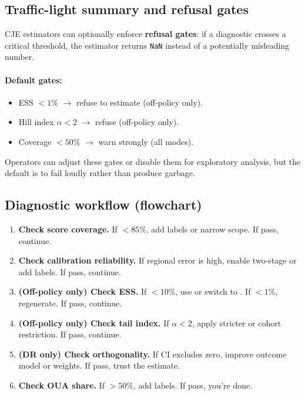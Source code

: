 \subsection{Traffic-light summary and refusal gates}

CJE estimators can optionally enforce \textbf{refusal gates}: if a diagnostic crosses a critical threshold, the estimator returns \texttt{NaN} instead of a potentially misleading number.

\paragraph{Default gates:}
\begin{itemize}
\item ESS $< 1\%$ $\to$ refuse to estimate (off-policy only).
\item Hill index $\alpha < 2$ $\to$ refuse (off-policy only).
\item Coverage $< 50\%$ $\to$ warn strongly (all modes).
\end{itemize}

Operators can adjust these gates or disable them for exploratory analysis, but the default is to fail loudly rather than produce garbage.

\subsection{Diagnostic workflow (flowchart)}

\begin{enumerate}
\item \textbf{Check score coverage.} If $< 85\%$, add labels or narrow scope. If pass, continue.
\item \textbf{Check calibration reliability.} If regional error is high, enable two-stage \autocal{} or add labels. If pass, continue.
\item \textbf{(Off-policy only) Check ESS.} If $< 10\%$, use \simcal{} or switch to \dr. If $< 1\%$, regenerate. If pass, continue.
\item \textbf{(Off-policy only) Check tail index.} If $\alpha < 2$, apply stricter \simcal{} or cohort restriction. If pass, continue.
\item \textbf{(DR only) Check orthogonality.} If CI excludes zero, improve outcome model or weights. If pass, trust the estimate.
\item \textbf{Check OUA share.} If $> 50\%$, add labels. If pass, you're done.
\end{enumerate}

